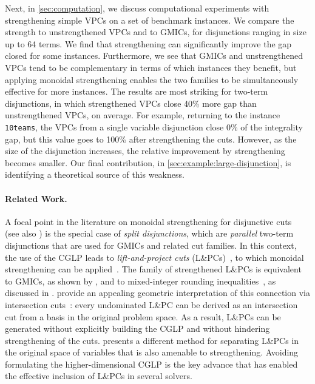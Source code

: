 \documentclass[oribibl,envcountsame]{llncs}
\theoremstyle{remark}
\theoremstyle{definition}
\newcommand{\instance}[1]{\texttt{#1}}
\begin{document}
Next, in \cref{sec:computation}, we discuss computational experiments with strengthening simple VPCs on a set of benchmark instances.
We compare the strength to unstrengthened VPCs and to GMICs, for disjunctions ranging in size up to 64 terms.
We find that strengthening can significantly improve the gap closed for some instances.
Furthermore, we see that GMICs and unstrengthened VPCs tend to be complementary in terms of which instances they benefit,
but applying monoidal strengthening enables the two families to be simultaneously effective for more instances.
The results are most striking for two-term disjunctions, in which strengthened VPCs close 40\% more gap than unstrengthened VPCs, on average.
For example, returning to the instance \instance{10teams}, the VPCs from a single variable disjunction close 0\% of the integrality gap, but this value goes to 100\% after strengthening the cuts.
However, as the size of the disjunction increases, the relative improvement by strengthening becomes smaller.
Our final contribution, in \cref{sec:example:large-disjunction}, is identifying a theoretical source of this weakness.

\paragraph{Related Work.}

A focal point in the literature on monoidal strengthening for disjunctive cuts~\cite{BalJer80} (see also \citet[Section~7]{Balas79})
is the special case of \emph{split disjunctions},
which are \emph{parallel} two-term disjunctions that are used for GMICs and related cut families.
In this context, the use of the CGLP leads to \emph{lift-and-project cuts} (L\&PCs)~\cite{BalCerCor93},
to which monoidal strengthening can be applied~\cite[Section~2.4]{BalCerCor96}.
The family of strengthened L\&PCs is equivalent to GMICs,
as shown by \citet{BalPer03},
and to mixed-integer rounding inequalities~\cite{NemWol88,NemWol90}, as discussed in \citet{CorLi01}.
\citet{BalPer03} provide an appealing geometric interpretation of this connection via intersection cuts~\cite{Balas71}:
every undominated L\&PC can be derived as an intersection cut from a basis in the original problem space.
As a result, L\&PCs can be generated without explicitly building the CGLP
and without hindering  strengthening of the cuts.
\citet{Bonami12} presents a different method for separating L\&PCs in the original space of variables that is also amenable to strengthening.
Avoiding formulating the higher-dimensional CGLP is the key advance that has enabled the effective inclusion of L\&PCs in several solvers.
\end{document}
